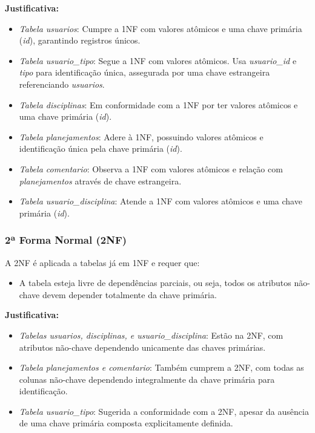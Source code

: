 \documentclass{article}
\begin{document}
\textbf{Justificativa:}
\begin{itemize}
    \item \textit{Tabela usuarios}: Cumpre a 1NF com valores atômicos e uma chave primária (\textit{id}), garantindo registros únicos.
    \item \textit{Tabela usuario\_tipo}: Segue a 1NF com valores atômicos. Usa \textit{usuario\_id} e \textit{tipo} para identificação única, assegurada por uma chave estrangeira referenciando \textit{usuarios}.
    \item \textit{Tabela disciplinas}: Em conformidade com a 1NF por ter valores atômicos e uma chave primária (\textit{id}).
    \item \textit{Tabela planejamentos}: Adere à 1NF, possuindo valores atômicos e identificação única pela chave primária (\textit{id}).
    \item \textit{Tabela comentario}: Observa a 1NF com valores atômicos e relação com \textit{planejamentos} através de chave estrangeira.
    \item \textit{Tabela usuario\_disciplina}: Atende a 1NF com valores atômicos e uma chave primária (\textit{id}).
\end{itemize}

\subsubsection{2ª Forma Normal (2NF)}
A 2NF é aplicada a tabelas já em 1NF e requer que:
\begin{itemize}
    \item A tabela esteja livre de dependências parciais, ou seja, todos os atributos não-chave devem depender totalmente da chave primária.
\end{itemize}

\textbf{Justificativa:}
\begin{itemize}
    \item \textit{Tabelas usuarios, disciplinas, e usuario\_disciplina}: Estão na 2NF, com atributos não-chave dependendo unicamente das chaves primárias.
    \item \textit{Tabela planejamentos e comentario}: Também cumprem a 2NF, com todas as colunas não-chave dependendo integralmente da chave primária para identificação.
    \item \textit{Tabela usuario\_tipo}: Sugerida a conformidade com a 2NF, apesar da ausência de uma chave primária composta explicitamente definida.
\end{itemize}
\end{document}
